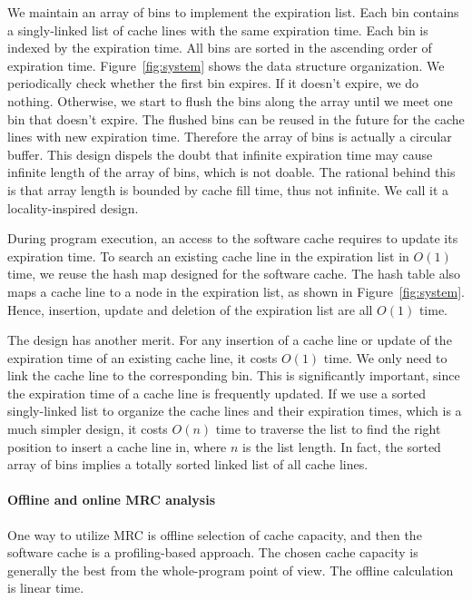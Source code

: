 \documentclass[preprint,nocopyrightspace,10pt]{sigplanconf}
\begin{document}
We maintain an array of bins to implement the expiration list. Each bin 
contains a singly-linked list of cache lines with the same expiration time. 
Each bin is indexed by the expiration time. All bins are sorted in the 
ascending order of expiration time. Figure~\ref{fig:system} shows the data 
structure organization. We periodically check whether the first bin expires. 
If it doesn't expire, we do nothing. Otherwise, we start to flush the bins 
along the array until we meet one bin that doesn't expire. The flushed 
bins can be reused in the future for the cache lines with new expiration time. 
Therefore the array of bins is actually a circular buffer. This design dispels
the doubt that infinite expiration time may cause infinite length of the array
of bins, which is not doable. The rational behind this is that array 
length is bounded by cache fill time, thus not infinite. We call it a locality-inspired 
design. 

During program execution, an access to the software cache requires 
to update its expiration time.  To search an existing cache line in the expiration
list in $O(1)$ time, we reuse the hash map designed for the software cache. 
The hash table also maps a cache line to a node in the expiration list, as 
shown in Figure~\ref{fig:system}. Hence, insertion, update and deletion of the 
expiration list are all $O(1)$ time.

The design has another merit. For any insertion of a cache line or update of 
the expiration time of an existing cache line, it costs $O(1)$ time. We only
need to link the cache line to the corresponding bin. This is significantly 
important, since the expiration time of a cache line is frequently updated. 
If we use a sorted singly-linked list to organize the cache lines and their 
expiration times, which is a much simpler design, it costs $O(n)$ time to 
traverse the list to find the right position to insert a cache line in, where 
$n$ is the list length. In fact, the sorted array of bins implies a totally 
sorted linked list of all cache lines. 

\paragraph{Offline and online MRC analysis}
One way to utilize MRC is offline selection of cache capacity, and then the software
cache is a profiling-based approach. The chosen cache capacity is generally 
the best from the whole-program point of view. The offline calculation is linear time. 
\end{document}
